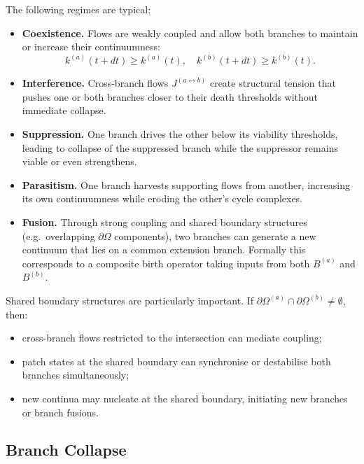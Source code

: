 The following regimes are typical:

\begin{itemize}
  \item \textbf{Coexistence.}\quad
        Flows are weakly coupled and allow both branches to maintain or
        increase their continuumness:
        \[
          k^{(a)}(t+dt) \ge k^{(a)}(t),\quad
          k^{(b)}(t+dt) \ge k^{(b)}(t).
        \]
  \item \textbf{Interference.}\quad
        Cross-branch flows \(J^{(a\leftrightarrow b)}\) create structural
        tension that pushes one or both branches closer to their death
        thresholds without immediate collapse.
  \item \textbf{Suppression.}\quad
        One branch drives the other below its viability thresholds, leading
        to collapse of the suppressed branch while the suppressor remains
        viable or even strengthens.
  \item \textbf{Parasitism.}\quad
        One branch harvests supporting flows from another, increasing its own
        continuumness while eroding the other's cycle complexes.
  \item \textbf{Fusion.}\quad
        Through strong coupling and shared boundary structures
        (e.g.\ overlapping \(\partial\Omega\) components), two branches
        can generate a new continuum that lies on a common extension branch.
        Formally this corresponds to a composite birth operator taking
        inputs from both \(B^{(a)}\) and \(B^{(b)}\).
\end{itemize}

Shared boundary structures are particularly important. If
\(\partial\Omega^{(a)}\cap\partial\Omega^{(b)}\neq\emptyset\), then:
\begin{itemize}
  \item cross-branch flows restricted to the intersection can mediate coupling;
  \item patch states at the shared boundary can synchronise or destabilise
        both branches simultaneously;
  \item new continua may nucleate at the shared boundary, initiating new
        branches or branch fusions.
\end{itemize}

\subsection{Branch Collapse}

